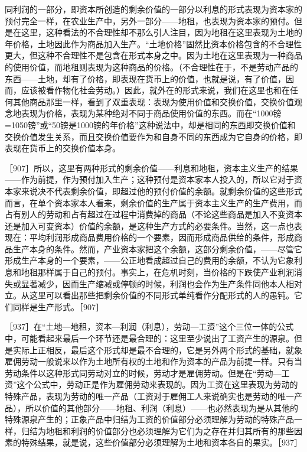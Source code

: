 同利润的一部分，即资本所创造的剩余价值的一部分以利息的形式表现为资本家的预付完全一样，在农业生产中，另外一部分——地租，也表现为资本家的预付。但是在这里，这种看法的不合理性却不那么引人注目，因为地租在这里表现为土地的年价格，土地因此作为商品加入生产。“土地价格”固然比资本价格包含的不合理性更大，但这种不合理性不是包含在形式本身之中。因为土地在这里表现为一种商品的使用价值，而地租则表现为这种商品的价格。（不合理性在于，不是劳动产品的东西——土地，却有了价格，即表现在货币上的价值，也就是说，有了价值，因而，应该被看作物化社会劳动。）因此，就外在的形式来说，我们在这里也和在任何其他商品那里一样，看到了双重表现：表现为使用价值和交换价值，交换价值观念地表现为价格，表现为某种绝对不同于商品使用价值的东西。而在“1000镑=1050镑”或“50镑是1000镑的年价格”这种说法中，却是相同的东西即交换价值和交换价值发生关系，而且交换价值要作为和自身不同的东西成为它自身的价格，即表现在货币上的交换价值本身。

［907］所以，这里有两种形式的剩余价值——利息和地租，资本主义生产的结果——作为前提，作为预付加入生产；这种预付是资本家本人投入的，所以它对于资本家来说决不代表剩余价值，即超过他的预付价值的余额。就剩余价值的这些形式而言，在单个资本家本人看来，剩余价值的生产属于资本主义生产的生产费用，而占有别人的劳动和占有超过在过程中消费掉的商品（不论这些商品是加入不变资本还是加入可变资本）价值的余额，是这种生产方式的必要条件。当然，这一点也表现在：平均利润形成商品费用价格的一个要素，因而形成商品供给的条件，形成商品生产本身的条件。然而，产业资本家把这个余额，这部分剩余价值，——尽管它形成生产本身的一个要素，——公正地看成超过自己的费用的余额，不认为它象利息和地租那样属于自己的预付。事实上，在危机时刻，当价格的下跌使产业利润消失或显著减少，因而生产缩减或停顿的时候，利润也会作为生产条件同他本人相对立。从这里可以看出那些把剩余价值的不同形式单纯看作分配形式的人的愚钝。它们同样是生产形式。［907］


［937］在“土地—地租，资本—利润（利息），劳动—工资”这个三位一体的公式中，可能看起来最后一个环节还是最合理的：这里至少说出了工资产生的源泉。但是实际上正相反，最后这个形式却是最不合理的，它是另外两个形式的基础，就象雇佣劳动一般说来以作为土地所有权的土地和作为资本的产品为前提一样。只有当劳动条件以这种形式同劳动对立的时候，劳动才是雇佣劳动。但是在“劳动—工资”这个公式中，劳动正是作为雇佣劳动来表现的。因为工资在这里表现为劳动的特殊产品，表现为劳动的唯一产品（工资对于雇佣工人来说确实也是劳动的唯一产品），所以价值的其他部分——地租、利润（利息）——也必然表现为是从其他的特殊源泉产生的；正象产品中归结为工资的价值部分必须理解为劳动的特殊产品一样，归结为地租和利润的价值部分也必须理解为它们为之存在并归其所有的那些因素的特殊结果，就是说，这些价值部分必须理解为土地和资本各自的果实。［937］

